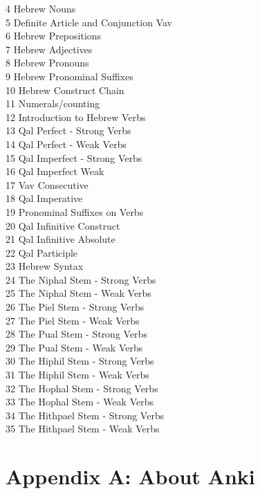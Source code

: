 \documentclass[
]{turabian-researchpaper}
\begin{document}
4 Hebrew Nouns\\
5 Definite Article and Conjunction Vav\\
6 Hebrew Prepositions\\
7 Hebrew Adjectives\\
8 Hebrew Pronouns\\
9 Hebrew Pronominal Suffixes\\
10 Hebrew Construct Chain\\
11 Numerals/counting\\
12 Introduction to Hebrew Verbs\\
13 Qal Perfect - Strong Verbs\\
14 Qal Perfect - Weak Verbs\\
15 Qal Imperfect - Strong Verbs\\
16 Qal Imperfect Weak\\
17 Vav Consecutive\\
18 Qal Imperative\\
19 Pronominal Suffixes on Verbs\\
20 Qal Infinitive Construct\\
21 Qal Infinitive Absolute\\
22 Qal Participle\\
23 Hebrew Syntax\\
24 The Niphal Stem - Strong Verbs\\
25 The Niphal Stem - Weak Verbs\\
26 The Piel Stem - Strong Verbs\\
27 The Piel Stem - Weak Verbs\\
28 The Pual Stem - Strong Verbs\\
29 The Pual Stem - Weak Verbs\\
30 The Hiphil Stem - Strong Verbs\\
31 The Hiphil Stem - Weak Verbs\\
32 The Hophal Stem - Strong Verbs\\
33 The Hophal Stem - Weak Verbs\\
34 The Hithpael Stem - Strong Verbs\\
35 The Hithpael Stem - Weak Verbs

\hypertarget{appendix-appendix}{%
\appendix}


\hypertarget{Anki}{%
\section*{Appendix A: About Anki}\label{Anki}}
\end{document}
